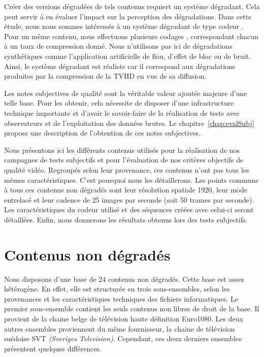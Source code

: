 Créer des versions dégradées de tels contenus requiert un système dégradant. Cela peut servir à en évaluer l'impact sur la perception des dégradations. Dans cette étude, nous nous sommes intéressés à un système dégradant de type codeur \avc. Pour un même contenu, nous effectuons plusieurs codages \avc, correspondant chacun à un taux de compression donné. Nous n'utilisons pas ici de dégradations synthétiques comme l'application artificielle de flou, d'effet de bloc ou de bruit. Ainsi, le système dégradant est réaliste car il correspond aux dégradations produites par la compression de la TVHD en vue de sa diffusion.

Les notes subjectives de qualité sont la véritable valeur ajoutée majeure d'une telle base. Pour les obtenir, cela nécessite de disposer d'une infrastructure technique importante et d'avoir le savoir-faire de la réalisation de tests avec observateurs et de l'exploitation des données brutes. Le chapitre~\ref{chap:evalSubj} propose une description de l'obtention de ces notes subjectives.

Nous présentons ici les différents contenus utilisés pour la réalisation de nos campagnes de tests subjectifs et pour l'évaluation de nos critères objectifs de qualité vidéo. Regroupés selon leur provenance, ces contenus n'ont pas tous les mêmes caractéristiques. C'est pourquoi nous les détaillerons. Les points communs à tous ces contenus non dégradés sont leur résolution spatiale 1920, leur mode entrelacé et leur cadence de 25 images par seconde (soit 50 trames par seconde). Les caractéristiques du codeur \avc{} utilisé et des séquences créées avec celui-ci seront détaillées. Enfin, nous donnerons les résultats obtenus lors des tests subjectifs.


\section{Contenus non dégradés}
Nous disposons d'une base de 24 contenus non dégradés. Cette base est assez hétérogène. En effet, elle est structurée en trois sous-ensembles, selon les provenances et les caractéristiques techniques des fichiers informatiques. Le premier sous-ensemble contient les seuls contenus non libres de droit de la base. Il provient de la chaine belge de télévision haute définition Euro1080. Les deux autres ensembles proviennent du même fournisseur, la chaine de télévision suédoise SVT \emph{(Sveriges Television)}. Cependant, ces deux derniers ensembles présentent quelques différences.


